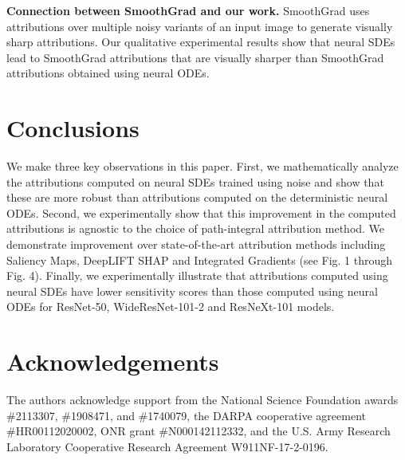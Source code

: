 \documentclass[10pt,twocolumn]{article}
\begin{document}
\textbf{Connection between SmoothGrad and our work.} SmoothGrad \cite{adebayo2018sanity} uses attributions over multiple noisy variants of an input image to generate visually sharp attributions. Our qualitative experimental results show that neural SDEs lead to SmoothGrad attributions that are visually sharper than SmoothGrad attributions obtained using neural ODEs.

\section{Conclusions}

We make three key observations in this paper. First, we mathematically analyze the attributions computed on neural SDEs trained using noise and show that these are more robust than attributions computed on the deterministic neural ODEs. Second, we experimentally show that this improvement in the computed attributions is agnostic to the choice of path-integral attribution method. We demonstrate improvement over state-of-the-art attribution methods including Saliency Maps, DeepLIFT SHAP and Integrated Gradients (see Fig. 1 through Fig. 4). Finally, we experimentally illustrate that attributions computed using neural SDEs have lower sensitivity scores than those computed using neural ODEs for ResNet-50, WideResNet-101-2 and ResNeXt-101 models.

\section{Acknowledgements}

The authors acknowledge support from the National Science Foundation awards \#2113307, \#1908471, and \#1740079, the DARPA cooperative agreement \#HR00112020002, ONR grant \#N000142112332, and the U.S. Army Research Laboratory Cooperative Research Agreement W911NF-17-2-0196.

\printbibliography
\end{document}
